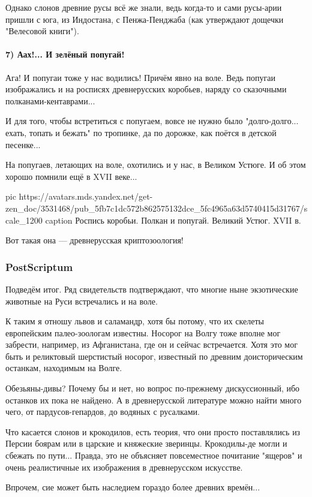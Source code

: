 Однако слонов древние русы всё же знали, ведь когда-то и сами русы-арии пришли
с юга, из Индостана, с Пенжа-Пенджаба (как утверждают дощечки "Велесовой
книги").

\paragraph{7) Аах!... И зелёный попугай!}

Ага! И попугаи тоже у нас водились! Причём явно на воле. Ведь попугаи
изображались и на росписях древнерусских коробьев, наряду со сказочными
полканами-кентаврами...

И для того, чтобы встретиться с попугаем, вовсе не нужно было "долго-долго...
ехать, топать и бежать" по тропинке, да по дорожке, как поётся в детской
песенке...

На попугаев, летающих на воле, охотились и у нас, в Великом Устюге. И об этом
хорошо помнили ещё в XVII веке...


\ifcmt
  pic https://avatars.mds.yandex.net/get-zen_doc/3531468/pub_5fb7c1dc572b862575132dce_5fc4965a63d5740415d31767/scale_1200
	caption Роспись коробьи. Полкан и попугай. Великий Устюг. XVII в.
\fi

Вот такая она — древнерусская криптозоология!

\subsubsection{PostScriptum}

Подведём итог. Ряд свидетельств подтверждают, что многие ныне экзотические
животные на Руси встречались и на воле.

К таким я отношу львов и саламандр, хотя бы потому, что их скелеты европейским
палео-зоологам известны. Носорог на Волгу тоже вполне мог забрести, например,
из Афганистана, где он и сейчас встречается. Хотя это мог быть и реликтовый
шерстистый носорог, известный по древним доисторическим останкам, находимым на
Волге.

Обезьяны-дивы? Почему бы и нет, но вопрос по-прежнему дискуссионный, ибо
останков их пока не найдено. А в древнерусской литературе можно найти много
чего, от пардусов-гепардов, до водяных с русалками.

Что касается слонов и крокодилов, есть теория, что они просто поставлялись из
Персии боярам или в царские и княжеские зверинцы. Крокодилы-де могли и сбежать
по пути... Правда, это не объясняет повсеместное почитание "ящеров" и очень
реалистичные их изображения в древнерусском искусстве.

Впрочем, сие может быть наследием гораздо более древних времён... 

